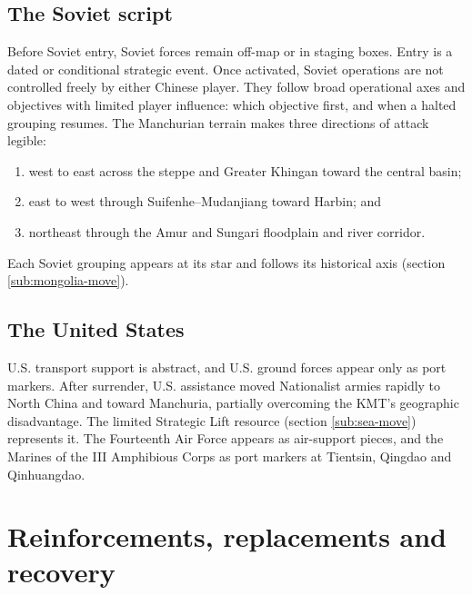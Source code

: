 \documentclass[11pt]{article}
\begin{document}
\subsection{The Soviet script}\label{sub:soviet}
Before Soviet entry, Soviet forces remain off-map or in staging boxes. Entry is a dated or conditional strategic event. Once activated, Soviet operations are not controlled freely by either Chinese player. They follow broad operational axes and objectives with limited player influence: which objective first, and when a halted grouping resumes. The Manchurian terrain makes three directions of attack legible:
\begin{enumerate}
\item west to east across the steppe and Greater Khingan toward the central basin;
\item east to west through Suifenhe--Mudanjiang toward Harbin; and
\item northeast through the Amur and Sungari floodplain and river corridor.
\end{enumerate}
Each Soviet grouping appears at its star and follows its historical axis (section \ref{sub:mongolia-move}).

\subsection{The United States}\label{sub:us}
U.S. transport support is abstract, and U.S. ground forces appear only as port markers. After surrender, U.S. assistance moved Nationalist armies rapidly to North China and toward Manchuria, partially overcoming the KMT's geographic disadvantage. The limited Strategic Lift resource (section \ref{sub:sea-move}) represents it. The Fourteenth Air Force appears as air-support pieces, and the Marines of the III Amphibious Corps as port markers at Tientsin, Qingdao and Qinhuangdao.

\section{Reinforcements, replacements and recovery}\label{sec:reinforce}
\end{document}
